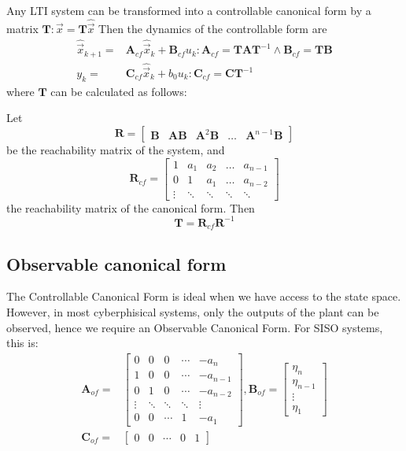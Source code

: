 \documentclass[runningheads,a4paper]{llncs}
\newcommand{\mat}[1]{\boldsymbol{#1}}
\begin{document}
Any LTI system can be transformed into a controllable canonical form by a matrix $\mat{T} : \vec{x}=\mat{T}\hat{\vec{x}}$
Then the dynamics of the controllable form are
\begin{align}
\hat{\vec{x}}_{k+1}=&\mat{A}_{cf}\hat{\vec{x}}_k+\mat{B}_{cf}u_k : \mat{A}_{cf}=\mat{T}\mat{A}\mat{T}^{-1} \wedge \mat{B}_{cf}=\mat{T}\mat{B}\\
y_k=&\mat{C}_{cf}\hat{\vec{x}}_k + b_0u_k : \mat{C}_{cf}=\mat{C}\mat{T}^{-1}\nonumber
\end{align}
where $\mat{T}$ can be calculated as follows:

Let 
\begin{equation}
\mat{R}=[\begin{array}{ccccc}\mat{B}&\mat{A}\mat{B}&\mat{A}^2\mat{B}&\hdots&\mat{A}^{n-1}\mat{B}\end{array}]
\label{eq:rncf}
\end{equation}
be the reachability matrix of the system, and
\begin{equation}
\mat{R}_{cf}=\left[\begin{array}{ccccc}1&a_1&a_2&\hdots&a_{n-1}\\0&1&a_1&\hdots&a_{n-2}\\ \vdots&\ddots&\ddots&\ddots&\ddots\end{array}\right]
\label{eq:rcf}
\end{equation}
the reachability matrix of the canonical form. Then 
\begin{equation}
\mat{T}=\mat{R}_{cf}\mat{R}^{-1}
\label{eq:to_cf}
\end{equation}

\subsection{Observable canonical form} \label{sec:observable}
The Controllable Canonical Form is ideal when we have access to the state space. However, in most cyberphisical
systems, only the outputs of the plant can be observed, hence we require an Observable Canonical Form.
For SISO systems, this is:
\begin{align}
\label{of_SISO}
\mat{A}_{of}=&\left[
\begin{array}{ccccc}
0&0&0&\cdots&-a_n\\
1&0&0&\cdots&-a_{n-1}\\
0&1&0&\cdots&-a_{n-2}\\
\vdots&\ddots&\ddots&\ddots&\vdots\\
0&0&\cdots&1&-a_1
\end{array}\right],
\mat{B}_{of}=\left[
\begin{array}{c}
\eta_n\\ \eta_{n-1}\\ \vdots\\ \eta_1
\end{array}\right]\\
\mat{C}_{of}=&[\begin{array}{ccccc}0&0&\cdots&0&1\end{array}] \nonumber
\end{align}
\end{document}
